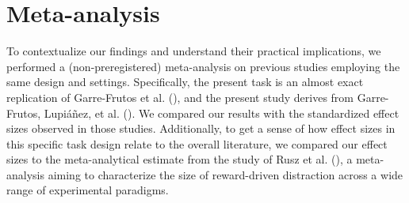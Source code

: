 \documentclass[
  man,
  floatsintext,
  longtable,
  nolmodern,
  notxfonts,
  notimes,
  mask,
  colorlinks=true,linkcolor=blue,citecolor=blue,urlcolor=blue]{apa7}
\begin{document}
\section{Meta-analysis}\label{meta-analysis}

To contextualize our findings and understand their practical
implications, we performed a (non-preregistered) meta-analysis on
previous studies employing the same design and settings. Specifically,
the present task is an almost exact replication of Garre-Frutos et al.
(), and the present study derives
from Garre-Frutos, Lupiáñez, et al.
(). We compared our results with
the standardized effect sizes observed in those studies. Additionally,
to get a sense of how effect sizes in this specific task design relate
to the overall literature, we compared our effect sizes to the
meta-analytical estimate from the study of Rusz et al.
(), a meta-analysis aiming to characterize
the size of reward-driven distraction across a wide range of
experimental paradigms.
\end{document}
